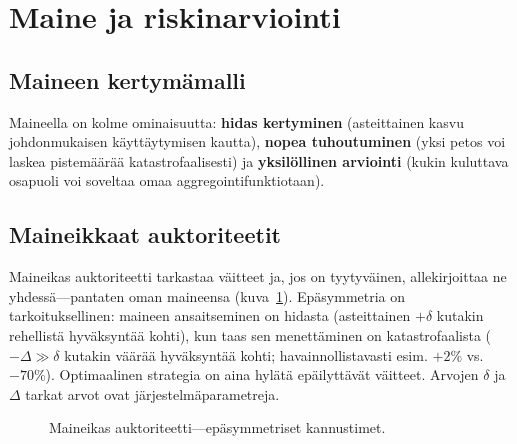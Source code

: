 \documentclass[11pt,a4paper,twocolumn]{article}
\begin{document}
\section{Maine ja riskinarviointi}

\subsection{Maineen kertymämalli}

Maineella on kolme ominaisuutta: \textbf{hidas kertyminen} (asteittainen kasvu johdonmukaisen käyttäytymisen kautta), \textbf{nopea tuhoutuminen} (yksi petos voi laskea pistemäärää katastrofaalisesti) ja \textbf{yksilöllinen arviointi} (kukin kuluttava osapuoli voi soveltaa omaa aggregointifunktiotaan).

\subsection{Maineikkaat auktoriteetit}

Maineikas auktoriteetti tarkastaa väitteet ja, jos on tyytyväinen, allekirjoittaa ne yhdessä---pantaten oman maineensa (kuva~\ref{fig:authority}). Epäsymmetria on tarkoituksellinen: maineen ansaitseminen on hidasta (asteittainen $+\delta$ kutakin rehellistä hyväksyntää kohti), kun taas sen menettäminen on katastrofaalista ($-\Delta \gg \delta$ kutakin väärää hyväksyntää kohti; havainnollistavasti esim. $+2\%$ vs.\ $-70\%$). Optimaalinen strategia on aina hylätä epäilyttävät väitteet. Arvojen $\delta$ ja $\Delta$ tarkat arvot ovat järjestelmäparametreja.

\begin{figure}[ht]
\centering
{}
\caption{Maineikas auktoriteetti---epäsymmetriset kannustimet.}
\label{fig:authority}
\end{figure}
\end{document}
